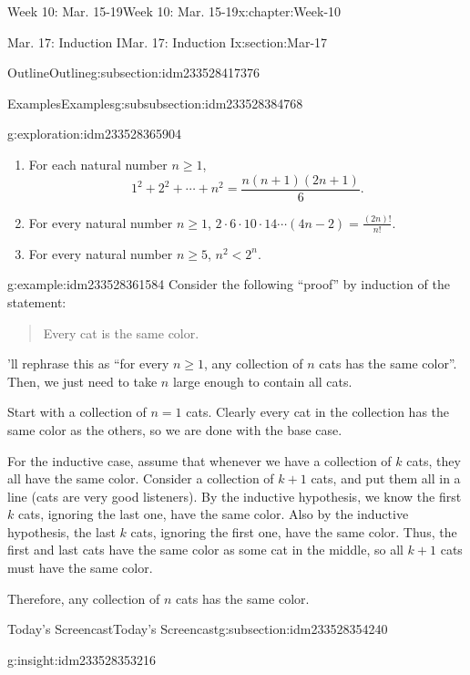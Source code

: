 \documentclass[oneside,10pt,]{book}
\numberwithin{equation}{section}
\renewcommand{\ge}{\geqslant}
\newcommand{\lt}{<}
\begin{document}
\begin{chapterptx}{Week 10: Mar. 15-19}{}{Week 10: Mar. 15-19}{}{}{x:chapter:Week-10}
\begin{sectionptx}{Mar. 17: Induction I}{}{Mar. 17: Induction I}{}{}{x:section:Mar-17}
\begin{subsectionptx}{Outline}{}{Outline}{}{}{g:subsection:idm233528417376}
\begin{subsubsectionptx}{Examples}{}{Examples}{}{}{g:subsubsection:idm233528384768}
\begin{exploration}{}{g:exploration:idm233528365904}
%
\begin{enumerate}
\item{}For each natural number \(n\ge 1\),%
\begin{equation*}
1^2 + 2^2 + \cdots + n^2 = \frac{n(n+1)(2n+1)}{6}.
\end{equation*}
%
\item{}For every natural number \(n\ge 1\), \(2\cdot 6\cdot 10 \cdot 14 \cdots (4n-2) = \frac{(2n)!}{n!}\).%
\item{}For every natural number \(n\ge 5\), \(n^2 \lt 2^n\).%
\end{enumerate}
\end{exploration}%
\begin{example}{}{g:example:idm233528361584}%
Consider the following ``proof'' by induction of the statement:%
\begin{quote}%
Every cat is the same color.\end{quote}
\par\smallskip%
\noindentWe'll rephrase this as ``for every \(n\ge 1\), any collection of \(n\) cats has the same color''. Then, we just need to take \(n\) large enough to contain all cats.%
\par
Start with a collection of \(n=1\) cats. Clearly every cat in the collection has the same color as the others, so we are done with the base case.%
\par
For the inductive case, assume that whenever we have a collection of \(k\) cats, they all have the same color. Consider a collection of \(k+1\) cats, and put them all in a line (cats are very good listeners). By the inductive hypothesis, we know the first \(k\) cats, ignoring the last one, have the same color. Also by the inductive hypothesis, the last \(k\) cats, ignoring the first one, have the same color. Thus, the first and last cats have the same color as some cat in the middle, so all \(k+1\) cats must have the same color.%
\par
Therefore, any collection of \(n\) cats has the same color.%
\end{example}
\end{subsubsectionptx}
\end{subsectionptx}
%
%
\typeout{************************************************}
\typeout{************************************************}
%
\begin{subsectionptx}{Today's Screencast}{}{Today's Screencast}{}{}{g:subsection:idm233528354240}
\begin{insight}{}{g:insight:idm233528353216}%

\end{insight}
\end{subsectionptx}
\end{sectionptx}
\end{chapterptx}
\end{document}
